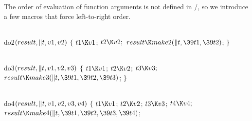 The order of evaluation of function arguments is not defined in \CEE/,
so we introduce a few macros that force left-to-right order.

\Y\B\4\D\\{do2}$(\\{result},\|t,\\{v1},\\{v2})$\6
${}\{{}$\5
\1${}\\{t1}\K\\{v1}{}$;\5
${}\\{t2}\K\\{v2};{}$\6
${}\\{result}\K\\{make2}(\|t,\39\\{t1},\39\\{t2}){}$;\5
${}\}{}$\2\par
\B\4\D\\{do3}$(\\{result},\|t,\\{v1},\\{v2},\\{v3})$\6
${}\{{}$\5
\1${}\\{t1}\K\\{v1}{}$;\5
${}\\{t2}\K\\{v2}{}$;\5
${}\\{t3}\K\\{v3};{}$\6
${}\\{result}\K\\{make3}(\|t,\39\\{t1},\39\\{t2},\39\\{t3}){}$;\5
${}\}{}$\2\par
\B\4\D\\{do4}$(\\{result},\|t,\\{v1},\\{v2},\\{v3},\\{v4})$\6
${}\{{}$\5
\1${}\\{t1}\K\\{v1}{}$;\5
${}\\{t2}\K\\{v2}{}$;\5
${}\\{t3}\K\\{v3}{}$;\5
${}\\{t4}\K\\{v4};{}$\6
${}\\{result}\K\\{make4}(\|t,\39\\{t1},\39\\{t2},\39\\{t3},\39\\{t4}){}$;\5

